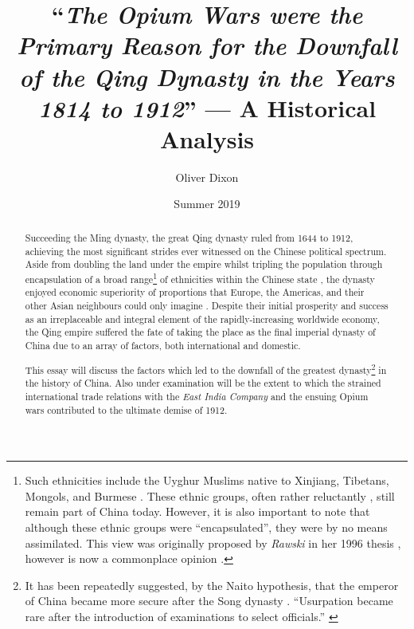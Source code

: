 \documentclass{article}
\title{``\emph{The Opium Wars were the Primary Reason for the Downfall of the Qing Dynasty in the Years 1814 to 1912}'' --- A Historical Analysis}
\author{Oliver Dixon}
\date{Summer 2019}
\begin{document}
\clearpage\maketitle
\thispagestyle{titlehdr}
\pagestyle{stdhdr}

\vspace*{-1.5em}
\begin{figure}[h!]
	\centering
        \def\svgwidth{0.5\linewidth}
	
\end{figure}
\vspace*{-0.5em}

\begin{abstract}

	Succeeding the Ming dynasty, the great Qing dynasty ruled from 1644 to 1912, achieving the most significant strides ever witnessed on the Chinese political spectrum. Aside from doubling the land under the empire \autocites{Turchin:2006}{Goldstone:1995} whilst tripling the population through encapsulation of a broad range\footnote{Such ethnicities include the Uyghur Muslims native to Xinjiang, Tibetans, Mongols, and Burmese \autocite{Chia:1993}. These ethnic groups, often rather reluctantly \autocites{Teichman:2002}{Smith:2009}{Dwyer:2005}, still remain part of China today. However, it is also important to note that although these ethnic groups were ``encapsulated'', they were by no means assimilated. This view was originally proposed by \textit{Rawski} in her 1996 thesis \autocite{Rawski:1996}, however is now a commonplace opinion \autocite{Hou:2014}.} of ethnicities within the Chinese state \autocite{Rowe:2012}, the dynasty enjoyed economic superiority of proportions that Europe, the Americas, and their other Asian neighbours could only imagine \autocite{Maddison:2007}. Despite their initial prosperity and success as an irreplaceable and integral element of the rapidly-increasing worldwide economy, the Qing empire suffered the fate of taking the place as the final imperial dynasty of China due to an array of factors, both international and domestic.

        This essay will discuss the factors which led to the downfall of the greatest dynasty\footnote{It has been repeatedly suggested, by the Naito hypothesis, that the emperor of China became more secure after the Song dynasty \autocite{Miyakawa:1955}. ``Usurpation became rare after the introduction of examinations to select officials.'' \autocite{Sng:2014}} in the history of China. Also under examination will be the extent to which the strained international trade relations with the \textit{East India Company} and the ensuing Opium wars contributed to the ultimate demise of 1912.

\end{abstract}
\end{document}
